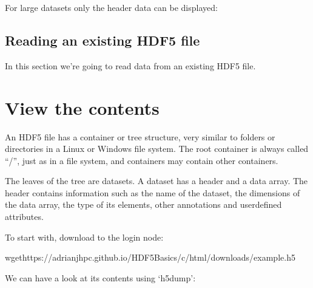 \documentclass[letterpaper,10pt,english]{sphinxmanual}
\begin{document}
\sphinxAtStartPar
For large datasets only the header data can be displayed:

\begin{sphinxVerbatim}[commandchars=\\\{\}]
  
\end{sphinxVerbatim}


\section{Reading an existing HDF5 file}
\label{\detokenize{index:reading-an-existing-hdf5-file}}
\sphinxAtStartPar
In this section we’re going to read data from an existing HDF5 file.


\chapter{View the contents}
\label{\detokenize{index:view-the-contents}}
\sphinxAtStartPar
An HDF5 file has a container or tree structure, very similar to folders or directories in a Linux or Windows file system. The root container is always called “/”, just as in a file system, and containers may contain other containers.

\sphinxAtStartPar
The leaves of the tree are datasets. A dataset has a header and a data array. The header contains information such as the name of the dataset, the dimensions of the data array, the type of its elements, other annotations and user\sphinxhyphen{}defined attributes.

\sphinxAtStartPar
To start with, download  to the login node:

\begin{sphinxVerbatim}[commandchars=\\\{\}]
wgethttps://adrianjhpc.github.io/HDF5\PYGZhy{}Basics/c/html/\PYGZus{}downloads/example.h5
\end{sphinxVerbatim}

\sphinxAtStartPar
We can have a look at its contents using ‘h5dump’:
\end{document}
